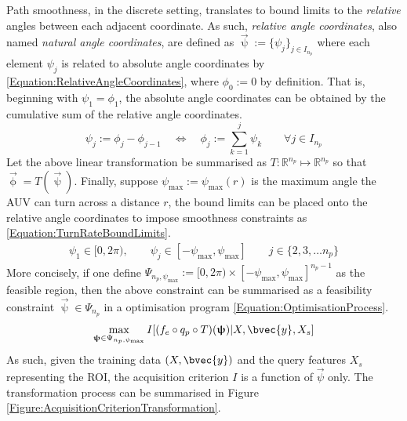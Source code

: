			Path smoothness, in the discrete setting, translates to bound limits to the \textit{relative} angles between each adjacent coordinate. As such, \textit{relative angle coordinates}, also named \textit{natural angle coordinates}, are defined as $\vec{\uppsi} := \{\psi_{j}\}_{j \in I_{n_{p}}}$ where each element $\psi_{j}$ is related to absolute angle coordinates by \eqref{Equation:RelativeAngleCoordinates}, where $\phi_{0} := 0$ by definition. That is, beginning with $\psi_{1} = \phi_{1}$, the absolute angle coordinates can be obtained by the cumulative sum of the relative angle coordinates. \begin{equation}
				\psi_{j} := \phi_{j} - \phi_{j - 1}	\quad \iff \quad \phi_{j} := \sum_{k = 1}^{j} \psi_{k} \qquad \forall j \in I_{n_{p}}
			\label{Equation:RelativeAngleCoordinates}
			\end{equation} Let the above linear transformation be summarised as $T: \mathbb{R}^{n_{p}} \mapsto \mathbb{R}^{n_{p}}$ so that $\vec{\upphi} = T(\vec{\uppsi})$. Finally, suppose $\psi_{\mathrm{max}} := \psi_{\mathrm{max}}(r)$ is the maximum angle the AUV can turn across a distance $r$, the bound limits can be placed onto the relative angle coordinates to impose smoothness constraints as \eqref{Equation:TurnRateBoundLimits}. \begin{equation}
				\begin{aligned}
					\psi_{1} \in [0, 2 \pi), \qquad
					\psi_{j} \in [-\psi_{\mathrm{max}}, \psi_{\mathrm{max}}] \qquad j \in \{2, 3, \dots n_{p}\}
				\end{aligned}
			\label{Equation:TurnRateBoundLimits}
			\end{equation} More concisely, if one define $\Psi_{n_{p}, \psi_{\mathrm{max}}} := [0, 2 \pi) \times [-\psi_{\mathrm{max}}, \psi_{\mathrm{max}}]^{n_{p} - 1}$ as the feasible region, then the above constraint can be summarised as a feasibility constraint $\vec{\uppsi} \in \Psi_{n_{p}}$ in a optimisation program \eqref{Equation:OptimisationProcess}. \begin{equation}
				\max_{\vec{\uppsi} \in \Psi_{n_{p}, \psi_{\mathrm{max}}}} I[(f_{e} \circ q_{p} \circ T)(\vec{\uppsi}) | X, \bvec{y}, X_{s}]				
			\label{Equation:OptimisationProcess}
			\end{equation} As such, given the training data $(X, \bvec{y})$ and the query features $X_{s}$ representing the ROI, the acquisition criterion $I$ is a function of $\vec{\psi}$ only. The transformation process can be summarised in Figure \ref{Figure:AcquisitionCriterionTransformation}.
			
